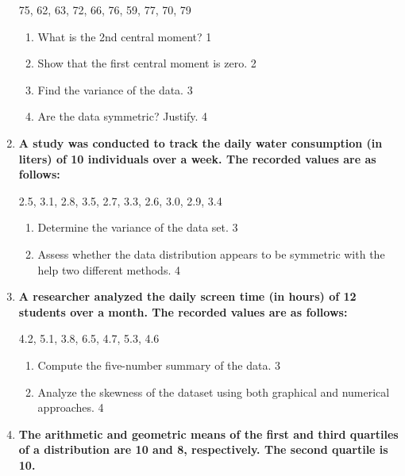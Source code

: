 \documentclass[a4paper,oneside]{book}
\begin{document}
\begin{enumerate}
	  \begin{center}
	  75, 62, 63, 72, 66, 76, 59, 77, 70, 79
	  \end{center}
    \begin{enumerate}
    \item
	What is the 2nd central moment? \hfill 1
    \item
	Show that the first central moment is zero. \hfill 2
    \item  
	Find the variance of the data. \hfill 3
    \item
	Are the data symmetric? Justify. \hfill 4
  \end{enumerate}
  
  \item
\textbf{A study was conducted to track the daily water consumption (in liters) 
of 10 individuals over a week. The recorded values are as follows:}

\begin{center}
2.5, 3.1, 2.8, 3.5, 2.7, 3.3, 2.6, 3.0, 2.9, 3.4
\end{center}

\begin{enumerate}
\item
Determine the variance of the data set. \hfill 3
\item
Assess whether the data distribution appears to be symmetric with the help
two different methods. \hfill 4
\end{enumerate}

\item  
\textbf{A researcher analyzed the daily screen time (in hours) of 12 students over a month. The recorded values are as follows:}  

\begin{center}  
4.2, 5.1, 3.8, 6.5, 4.7, 5.3, 4.6  
\end{center}  

\begin{enumerate}  
\item  
Compute the five-number summary of the data. \hfill 3  
\item  
Analyze the skewness of the dataset using both graphical and numerical approaches. \hfill 4  
\end{enumerate}  

  
   \item
	  \textbf{The arithmetic and geometric means of the first and third 
	  quartiles of a distribution are 10 and 8, respectively. The 
	  second quartile is 10.} 
  

\end{enumerate}
\end{document}
